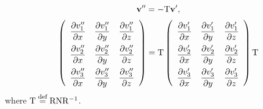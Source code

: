 \documentclass[a4paper,12pt,dvips]{article}
\newcommand*\defeq{\buildrel{\text{def}}\over{=}}
\begin{document}
\begin{align*}
\begin{gathered}
  \mathbf{v}'' = -\mathrm{T}\mathbf{v}', \\
  \renewcommand{\arraystretch}{2.2}
  \left(\begin{array}{ccc}
    \dfrac{\partial v''_1}{\partial x} &
    \dfrac{\partial v''_1}{\partial y} &
    \dfrac{\partial v''_1}{\partial z} \\
    \dfrac{\partial v''_2}{\partial x} &
    \dfrac{\partial v''_2}{\partial y} &
    \dfrac{\partial v''_2}{\partial z} \\
    \dfrac{\partial v''_3}{\partial x} &
    \dfrac{\partial v''_3}{\partial y} &
    \dfrac{\partial v''_3}{\partial z}
  \end{array}\right)
  = \mathrm{T}
  \left(\begin{array}{ccc}
    \dfrac{\partial v'_1}{\partial x} &
    \dfrac{\partial v'_1}{\partial y} &
    \dfrac{\partial v'_1}{\partial z} \\
    \dfrac{\partial v'_2}{\partial x} &
    \dfrac{\partial v'_2}{\partial y} &
    \dfrac{\partial v'_2}{\partial z} \\
    \dfrac{\partial v'_3}{\partial x} &
    \dfrac{\partial v'_3}{\partial y} &
    \dfrac{\partial v'_3}{\partial z}
  \end{array}\right)
  \mathrm{T}
\end{gathered}
\end{align*}
where $\mathrm{T} \defeq \mathrm{RNR^{-1}}$.
\end{document}
